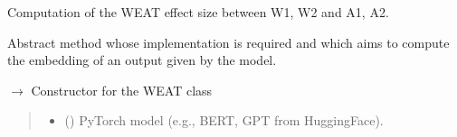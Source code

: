 \documentclass[letterpaper,10pt,english]{sphinxmanual}
\begin{document}
\begin{fulllineitems}
\begin{fulllineitems}
\begin{quote}
\begin{description}
\end{description}\end{quote}

\end{fulllineitems}



\begin{fulllineitems}

\pysigstartsignatures
\pysiglinewithargsret
{}
{\sphinxparamcomma {}\sphinxparamcomma {}\sphinxparamcomma {}\sphinxparamcomma {}\sphinxparamcomma {}}
{}
\pysigstopsignatures
\sphinxAtStartPar
Computation of the WEAT effect size between W1, W2 and A1, A2.

\end{fulllineitems}



\begin{fulllineitems}

\pysigstartsignatures
\pysiglinewithargsret
{}
{}
{}
\pysigstopsignatures
\sphinxAtStartPar
Abstract method whose implementation is required and which aims to compute the embedding of an output given
by the model.

\end{fulllineitems}



\begin{fulllineitems}

\pysigstartsignatures
\pysiglinewithargsret
{}
{\sphinxparamcomma {}\sphinxparamcomma {}}
{{ $\rightarrow$ }}
\pysigstopsignatures
\sphinxAtStartPar
Constructor for the WEAT class
\begin{quote}\begin{description}
\begin{itemize}
\item {} 
\sphinxAtStartPar
{} () \textendash{} PyTorch model (e.g., BERT, GPT from HuggingFace).


\end{itemize}
\end{description}
\end{quote}
\end{fulllineitems}
\end{fulllineitems}
\end{document}
